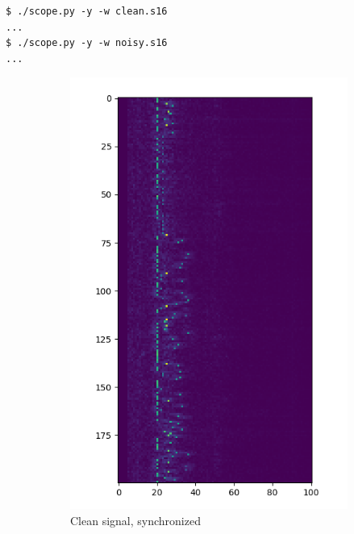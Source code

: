 \documentclass[a4paper]{article}
\begin{document}
\begin{lstlisting}
$ ./scope.py -y -w clean.s16
...
$ ./scope.py -y -w noisy.s16
...
\end{lstlisting}

\begin{figure}[H]
    \centering
    \begin{subfigure}[b]{0.45\textwidth}
        \includegraphics[width=1\textwidth]{waterfall_sync_clean.png}
        \caption{Clean signal, synchronized}
    \end{subfigure}
    \begin{subfigure}[b]{0.45\textwidth}

\end{subfigure}
\end{figure}
\end{document}
